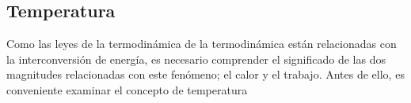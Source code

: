 \documentclass[../master.tex]{subfiles}
\begin{document}
\subsection{Temperatura}

Como las leyes de la termodinámica de la termodinámica están relacionadas con la interconversión de energía, es necesario comprender el significado de las dos magnitudes relacionadas con este fenómeno; el calor y el trabajo. Antes de ello, es conveniente examinar el concepto de temperatura

\clearpage
\renewcommand{\nomname}{Nomenclatura del capítlo}
\printnomenclature

\printbibliography[title=Bibliografía del capítulo]
\end{document}
